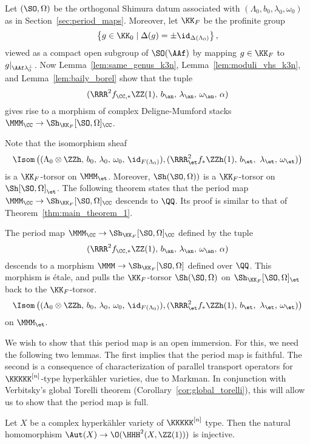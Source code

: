 Let $(\SO,\Omega)$ be the orthogonal Shimura datum associated with $(\Lambda_0,b_0,\lambda_0,\omega_0)$ as in Section~\ref{sec:period_maps}. Moreover, let $\KK_{F}$ be the profinite group
$$
\left\{g \in \KK_0 \mid \Delta(g) = \pm \id_{\Delta(\Lambda_0)}\right\},
$$
viewed as a compact open subgroup of $\SO(\AAf)$ by mapping $g \in \KK_F$ to $g|_{\AAf \lambda_0^{\perp}}$. Now Lemma~\ref{lem:same_genus_k3n}, Lemma~\ref{lem:moduli_vhs_k3n}, and Lemma~\ref{lem:baily_borel} show that the tuple 
$$
(\RRR^2f_{\CC,*} \ZZ(1),\, b_{\an},\, \lambda_{\an},\, \omega_{\an},\, \alpha)
$$
gives rise to a morphism of complex Deligne-Mumford stacks $\MMM_{\CC} \rightarrow \Sh_{\KK_F}[\SO,\Omega]_{\CC}$.

Note that the isomorphism sheaf
$$
\Isom\left((\Lambda_0 \otimes \ZZh,\, b_0,\, \lambda_0,\, \omega_0,\, \id_{F(\Lambda_0)}),(\RRR^2_{\et}f_* \ZZh(1),\, b_{\et},\ \lambda_{\et},\, \omega_{\et})\right)
$$
is a $\KK_{F}$-torsor on $\MMM_{\et}$. Moreover, $\Sh(\SO,\Omega))$ is a $\KK_{F}$-torsor on $\Sh[\SO,\Omega]_{\et}$. The following theorem states that the period map $\MMM_{\CC} \rightarrow \Sh_{\KK_F}[\SO,\Omega]_{\CC}$ descends to $\QQ$. Its proof is similar to that of Theorem~\ref{thm:main_theorem_1}.
\begin{theorem}\label{thm:main_thm_k3n}
The period map $\MMM_{\CC} \rightarrow \Sh_{\KK_F}[\SO,\Omega]_{\CC}$ defined by the tuple
$$
(\RRR^2f_{\CC,*} \ZZ(1),\, b_{\an},\, \lambda_{\an},\, \omega_{\an},\, \alpha)
$$
descends to a morphism $\MMM \rightarrow \Sh_{\KK_F}[\SO,\Omega]$ defined over $\QQ$. This morphism is \'etale, and pulls the $\KK_F$-torsor $\Sh(\SO,\Omega)$ on $\Sh_{\KK_F}[\SO,\Omega]_{\et}$ back to the $\KK_F$-torsor.
$$
\Isom\left((\Lambda_0 \otimes \ZZh,\, b_0,\, \lambda_0,\, \omega_0,\, \id_{F(\Lambda_0)}),(\RRR^2_{\et}f_* \ZZh(1),\, b_{\et},\ \lambda_{\et},\, \omega_{\et})\right)
$$
on $\MMM_{\et}$.
\end{theorem}

We wish to show that this period map is an open immersion. For this, we need the following two lemmas. The first implies that the period map is faithful. The second is a consequence of characterization of parallel transport operators for $\KKKKK^{[n]}$-type hyperk\"ahler varieties, due to Markman. In conjunction with Verbitsky's global Torelli theorem (Corollary~\ref{cor:global_torelli}), this will allow us to show that the period map is full.

\begin{lemma}\label{lem:faithful_k3n}
Let $X$ be a complex hyperk\"ahler variety of $\KKKKK^{[n]}$ type. Then the natural homomorphism $\Aut(X) \rightarrow \O(\HHH^2(X,\ZZ(1)))$ is injective.
\end{lemma}

